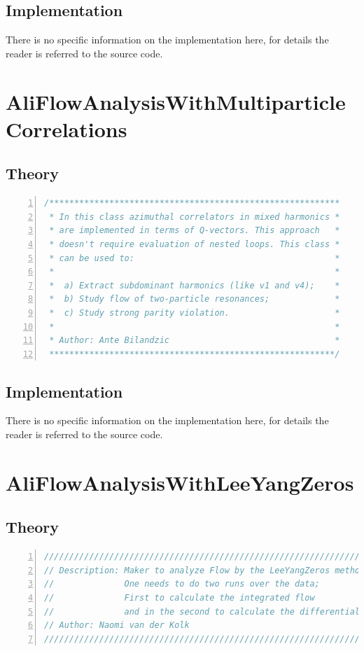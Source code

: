 \documentclass[a4paper]{book}
\numberwithin{equation}{subsection}
\begin{document}
\subsection{Implementation}
There is no specific information on the implementation here, for details the reader is referred to the source code.


\section{AliFlowAnalysisWithMultiparticleCorrelations}
\subsection{Theory}
\begin{lstlisting}[language=C, numbers=left]
/********************************************************** 
 * In this class azimuthal correlators in mixed harmonics *
 * are implemented in terms of Q-vectors. This approach   *
 * doesn't require evaluation of nested loops. This class *
 * can be used to:                                        *
 *                                                        *  
 *  a) Extract subdominant harmonics (like v1 and v4);    *
 *  b) Study flow of two-particle resonances;             *
 *  c) Study strong parity violation.                     * 
 *                                                        * 
 * Author: Ante Bilandzic                                 *
 *********************************************************/ \end{lstlisting}
\subsection{Implementation}
There is no specific information on the implementation here, for details the reader is referred to the source code.

\section{AliFlowAnalysisWithLeeYangZeros}
\subsection{Theory}
\begin{lstlisting}[language=C, numbers=left]
////////////////////////////////////////////////////////////////////
// Description: Maker to analyze Flow by the LeeYangZeros method
//              One needs to do two runs over the data; 
//              First to calculate the integrated flow 
//              and in the second to calculate the differential flow
// Author: Naomi van der Kolk 
//////////////////////////////////////////////////////////////////// \end{lstlisting}
\end{document}
